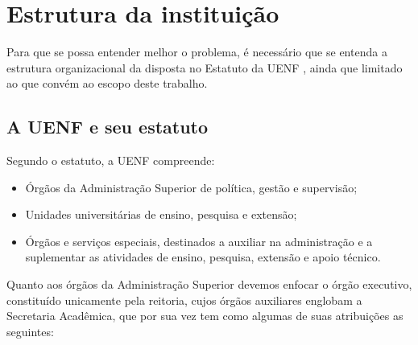 \chapter[Estrutura]{Estrutura da instituição} \label{chap:instituicao}

Para que se possa entender melhor o problema, é necessário que se entenda a estrutura organizacional da  disposta no Estatuto da UENF \cite{Estatuto2002}, ainda que limitado ao que convém ao escopo deste trabalho.

\section{A UENF e seu estatuto} %


Segundo o estatuto, a UENF compreende:

\begin{itemize}
  \item Órgãos da Administração Superior de política, gestão e supervisão;
  \item Unidades universitárias de ensino, pesquisa e extensão;
  \item Órgãos e serviços especiais, destinados a auxiliar na administração e a suplementar as atividades de ensino, pesquisa, extensão e apoio técnico.
\end{itemize}


Quanto aos órgãos da Administração Superior devemos enfocar o órgão executivo, constituído unicamente pela reitoria, cujos órgãos auxiliares englobam a Secretaria Acadêmica, que por sua vez tem como algumas de suas atribuições as seguintes:

